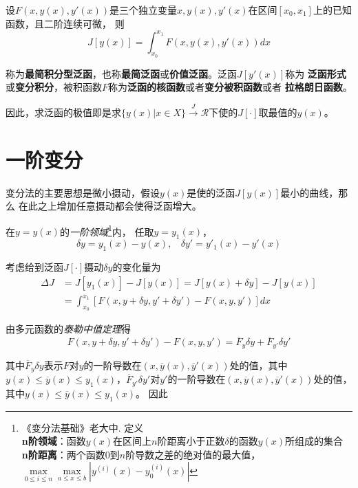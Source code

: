 设$F(x,y(x),y'(x))$是三个独立变量$x,y(x),y'(x)$在区间$[x_0,x_1]$上的已知函数，且二阶连续可微，
则
\begin{equation}
    J[y(x)]=\int_{x_0}^{x_1}F(x,y(x),y'(x))dx
\end{equation}

称为\textbf{最简积分型泛函}，也称\textbf{最简泛函}或\textbf{价值泛函}。泛函$J[y'(x)]$称为
\textbf{泛函形式}或\textbf{变分积分}，被积函数$F$称为\textbf{泛函的核函数}或者\textbf{变分被积函数}或者
\textbf{拉格朗日函数}。

因此，求泛函的极值即是求$\{y(x)|x\in X\}\xrightarrow{J} \mathcal{R}$下使的$J[\cdot]$取最值的$y(x)$。

\section{一阶变分}

变分法的主要思想是微小摄动，假设$y(x)$是使的泛函$J[y(x)]$最小的曲线，那么
在此之上增加任意摄动都会使得泛函增大。

在$y=y(x)$的\textsl{一阶领域}\footnote{《变分法基础》老大中. 定义\\ \hspace*{2em}\textbf{n阶领域}：函数$y(x)$在区间上$n$阶距离小于正数$\delta$的函数$y(x)$所组成的集合\\ \hspace*{2em}\textbf{n阶距离}：两个函数$0$到$n$阶导数之差的绝对值的最大值，$\max\limits_{0\leqslant i\leqslant n}\max\limits_{a\leqslant x\leqslant b}|y^{(i)}(x)-y_0^{(i)}(x)|$}内，
任取$y=y_1(x)$，
\begin{equation}
    \delta y=y_1(x)-y(x),\ \ \ \ \delta y'=y'_1(x)-y'(x) 
\end{equation}

考虑给到泛函$J[\cdot]$摄动$\delta y$的变化量为
\begin{equation}
    \begin{aligned}
         \Delta J&=J[y_1(x)]-J[y(x)]=J[y(x)+\delta y]-J[y(x)]\\
        &=\int_{x_0}^{x_1}[F(x,y+\delta y,y'+\delta y')-F(x,y,y')]dx
    \end{aligned}
\end{equation}

由多元函数的\textsl{泰勒中值定理}得
\begin{equation}
    F(x,y+\delta y,y'+\delta y')-F(x,y,y')=\overline{F}_y\delta y+\overline{F}_{y'}\delta y'
\end{equation}

其中$\overline{F}_{y}\delta y$表示$F$对$y$的一阶导数在$(x,\overline{y}(x),\overline{y}'(x))$处的值，其中$y(x)\leqslant \overline{y}(x)\leqslant y_1(x)$，$\overline{F}_{y'}\delta y'$对$y'$的一阶导数在$(x,\overline{y}(x),\overline{y}'(x))$处的值，其中$y(x)\leqslant \overline{y}(x)\leqslant y_1(x)$。
因此

